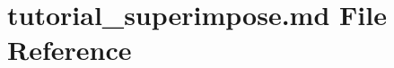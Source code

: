 \hypertarget{tutorial__superimpose_8md}{}\section{tutorial\+\_\+superimpose.\+md File Reference}
\label{tutorial__superimpose_8md}
